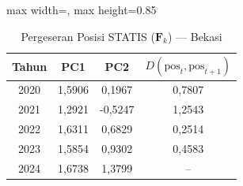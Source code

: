 \begin{table}[H]
\centering
\caption{Pergeseran Posisi STATIS ($\mathbf{F}_k$) --- Bekasi} \label{tab:app2jarak_statis_skor_bekasi}
\begin{adjustbox}{max width=\textwidth, max height=0.85\textheight}
\begin{tabular}{|c|c|c|c|}
\hline
\textbf{Tahun} & \textbf{PC1} & \textbf{PC2} & \textbf{$D(\text{pos}_t, \text{pos}_{t+1})$} \\
\hline
2020 & 1,5906 & 0,1967 & 0,7807 \\
2021 & 1,2921 & -0,5247 & 1,2543 \\
2022 & 1,6311 & 0,6829 & 0,2514 \\
2023 & 1,5854 & 0,9302 & 0,4583 \\
2024 & 1,6738 & 1,3799 & -- \\
\hline
\end{tabular}
\end{adjustbox}
\end{table}